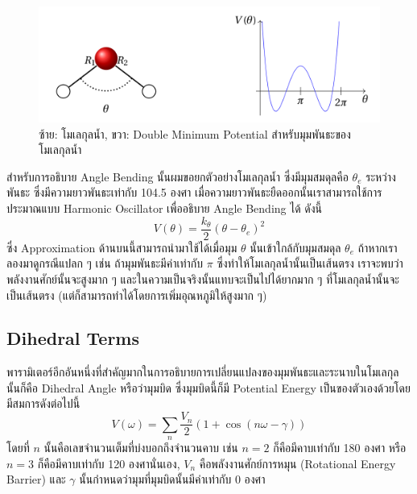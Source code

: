 \begin{figure}[H]
  \centering
  \includegraphics[width=0.8\linewidth]{fig/water-angle-bending.png}
  \caption{ซ้าย: โมเลกุลน้ำ, ขวา: Double Minimum Potential สำหรับมุมพันธะของโมเลกุลน้ำ}
  \label{fig:water_angle_bending}
\end{figure}

สำหรับการอธิบาย Angle Bending นั้นผมขอยกตัวอย่างโมเลกุลน้ำ  ซึ่งมีมุมสมดุลคือ $\theta_{e}$ ระหว่างพันธะ  ซึ่งมีความยาวพันธะเท่ากับ 104.5 องศา เมื่อความยาวพันธะยืดออกนั้นเราสามารถใช้การประมาณแบบ Harmonic Oscillator เพื่ออธิบาย Angle Bending ได้ ดังนี้
%
\begin{equation}
  V(\theta)
  =
  \frac{k_{\theta}}{2}
  (\theta - \theta_{e})^{2}
\end{equation}
%
ซึ่ง Approximation ด้านบนนี้สามารถนำมาใช้ได้เมื่อมุม $\theta$ นั้นเข้าใกล้กับมุมสมดุล $\theta_{e}$
%
ถ้าหากเราลองมาดูกรณีแปลก ๆ เช่น ถ้ามุมพันธะมีค่าเท่ากับ $\pi$ ซึ่งทำให้โมเลกุลน้ำนั้นเป็นเส้นตรง เราจะพบว่าพลังงานศักย์นั้นจะสูงมาก ๆ และในความเป็นจริงนั้นแทบจะเป็นไปได้ยากมาก ๆ ที่โมเลกุลน้ำนั้นจะเป็นเส้นตรง (แต่ก็สามารถทำได้โดยการเพิ่มอุณหภูมิให้สูงมาก ๆ)

\subsection{Dihedral Terms}

พารามิเตอร์อีกอันหนึ่งที่สำคัญมากในการอธิบายการเปลี่ยนแปลงของมุมพันธะและระนาบในโมเลกุลนั้นก็คือ Dihedral Angle หรือว่ามุมบิด ซึ่งมุมบิดนี้ก็มี Potential Energy เป็นของตัวเองด้วยโดยมีสมการดังต่อไปนี้
%
\begin{equation}
  V(\omega)
  =
  \sum_{n} \frac{V_{n}}{2}
  \left(
  1 + \cos(n\omega - \gamma)
  \right)
\end{equation}
%
โดยที่ $n$ นั้นคือเลขจำนวนเต็มที่บ่งบอกถึงจำนวนคาบ เช่น $n = 2$ ก็คือมีคาบเท่ากับ 180 องศา หรือ $n = 3$ ก็คือมีคาบเท่ากับ 120 องศานั่นเอง, $V_{n}$ คือพลังงานศักย์การหมุน (Rotational Energy Barrier) และ $\gamma$ นั้นกำหนดว่ามุมที่มุมบิดนั้นมีค่าเท่ากับ 0 องศา

